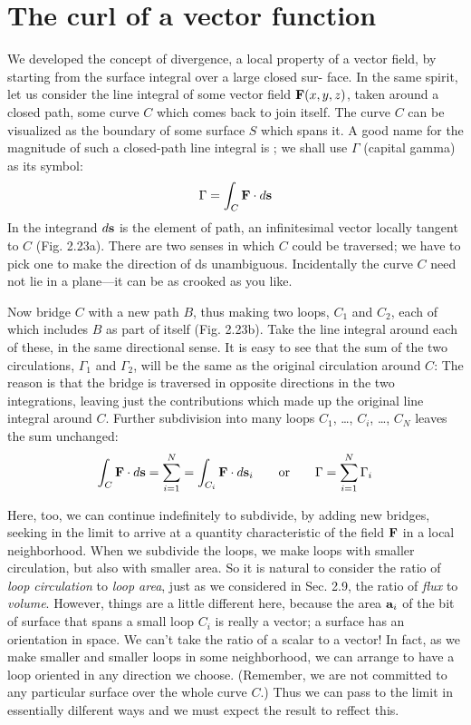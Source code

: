 \section{The curl of a vector function}

We developed the concept of divergence, a local property of a vector
field, by starting from the surface integral over a large closed sur-
face. In the same spirit, let us consider the line integral of some vector
field $\mathbf{F}(x,y,z)$, taken around a closed path, some curve $C$ which
comes back to join itself. The curve $C$ can be visualized as the
boundary of some surface $S$ which spans it. A good name for the
magnitude of such a closed-path line integral is ; we shall
use $\Gamma$ (capital gamma) as its symbol:
\begin{equation}
  \Gamma = \int_C \mathbf{F}\cdot\mathop{d\!}\mathbf{s}
\end{equation}
In the integrand $\mathop{d\!}\mathbf{s}$ is the element of path, an infinitesimal vector
locally tangent to $C$ (Fig. 2.23a). There are two senses in which $C$
could be traversed; we have to pick one to make the direction of ds
unambiguous. Incidentally the curve $C$ need not lie in a plane---it
can be as crooked as you like.

Now bridge $C$ with a new path $B$, thus making two loops, $C_1$ and
$C_2$, each of which includes $B$ as part of itself (Fig. 2.23b). Take the
line integral around each of these, in the same directional sense. It
is easy to see that the sum of the two circulations, $\Gamma_1$ and $\Gamma_2$, will be
the same as the original circulation around $C$: The reason is that the
bridge is traversed in opposite directions in the two integrations,
leaving just the contributions which made up the original line integral
around $C$. Further subdivision into many loops $C_1$, \ldots , $C_i$, \ldots , $C_N$
leaves the sum unchanged:
\begin{equation}
  \int_C \mathbf{F}\cdot\mathop{d\!}\mathbf{s} = \sum_{i=1}^N 
          = \int_{C_i} \mathbf{F}\cdot\mathop{d\!}\mathbf{s}_i
   \qquad \text{or} \qquad
  \Gamma = \sum_{i=1}^N \Gamma_i
\end{equation}

Here, too, we can continue indefinitely to subdivide, by adding
new bridges, seeking in the limit to arrive at a quantity characteristic
of the field $\mathbf{F}$ in a local neighborhood. When we subdivide the loops,
we make loops with smaller circulation, but also with smaller area.
So it is natural to consider the ratio of \emph{loop circulation} to \emph{loop area},
just as we considered in Sec. 2.9, the ratio of \emph{flux} to \emph{volume}. However,
things are a little different here, because the area $\mathbf{a}_i$ of the bit
of surface that spans a small loop $C_i$ is really a vector; a surface has
an orientation in space. We can't take the ratio of a scalar to a
vector! In fact, as we make smaller and smaller loops in some
neighborhood, we can arrange to have a loop oriented in any direction
we choose. (Remember, we are not committed to any particular
surface over the whole curve $C$.) Thus we can pass to the limit in
essentially dilferent ways and we must expect the result to reffect this.

